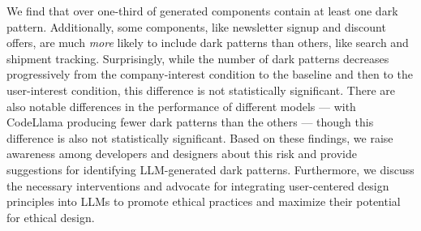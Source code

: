 We find that over one-third of generated components contain at least one dark pattern. Additionally, some components, like newsletter signup and discount offers, are much \textit{more} likely to include dark patterns than others, like search and shipment tracking. Surprisingly, while the number of dark patterns decreases progressively from the company-interest condition to the baseline and then to the user-interest condition, this difference is not statistically significant. There are also notable differences in the performance of different models --- with CodeLlama producing fewer dark patterns than the others --- though this difference is also not statistically significant. %
Based on these findings, we raise awareness among developers and designers about this risk and provide suggestions for identifying LLM-generated dark patterns. Furthermore, we discuss the necessary interventions and advocate for integrating user-centered design principles into LLMs to promote ethical practices and maximize their potential for ethical design.